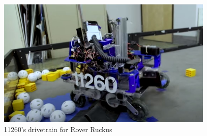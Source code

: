 \begin{figure}
\centering
\includegraphics[width=0.955\textwidth, angle=0]{Meetings/September/09-23-21/9-21-21_Hardware_Image1 - Nathan Forrer.JPG}
\caption{11260's drivetrain for Rover Ruckus}
\label{fig:092322_5}
\end{figure}




